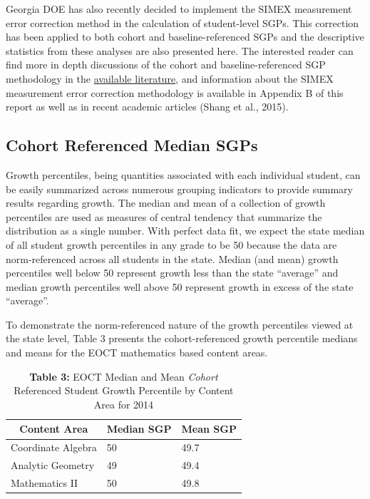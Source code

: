 \documentclass[12pt]{article}
\begin{document}
Georgia DOE has also recently decided to implement the SIMEX measurement
error correction method in the calculation of student-level SGPs. This
correction has been applied to both cohort and baseline-referenced SGPs
and the descriptive statistics from these analyses are also presented
here. The interested reader can find more in depth discussions of the
cohort and baseline-referenced SGP methodology in the
\href{https://github.com/CenterForAssessment/SGP_Resources/tree/master/articles}{available
literature}, and information about the SIMEX measurement error
correction methodology is available in Appendix B of this report as well
as in recent academic articles (Shang et al., 2015).

\subsection{Cohort Referenced Median
SGPs}\label{cohort-referenced-median-sgps}

Growth percentiles, being quantities associated with each individual
student, can be easily summarized across numerous grouping indicators to
provide summary results regarding growth. The median and mean of a
collection of growth percentiles are used as measures of central
tendency that summarize the distribution as a single number. With
perfect data fit, we expect the state median of all student growth
percentiles in any grade to be 50 because the data are norm-referenced
across all students in the state. Median (and mean) growth percentiles
well below 50 represent growth less than the state ``average'' and
median growth percentiles well above 50 represent growth in excess of
the state ``average''.

To demonstrate the norm-referenced nature of the growth percentiles
viewed at the state level, Table 3 presents the cohort-referenced growth
percentile medians and means for the EOCT mathematics based content
areas.

\begin{table}[H]
\caption*{\textbf{Table 3:} EOCT Median and Mean \emph{Cohort} Referenced Student Growth Percentile by Content Area for 2014\label{table3}} 
\begin{center}
\begin{tabular}{lll}
\hline\hline
\multicolumn{1}{c}{Content Area}&\multicolumn{1}{c}{Median SGP}&\multicolumn{1}{c}{Mean SGP}\tabularnewline
\hline
Coordinate Algebra&50&49.7\tabularnewline
Analytic Geometry&49&49.4\tabularnewline
Mathematics II&50&49.8\tabularnewline
\hline
\end{tabular}\end{center}

\end{table}
\end{document}
